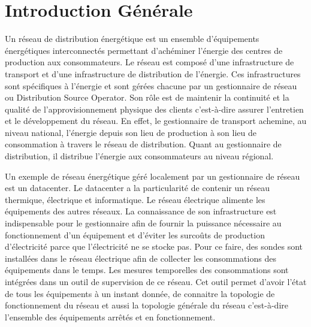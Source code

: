 \chapter{Introduction G\'en\'erale}

Un r\'eseau de distribution \'energ\'etique est un ensemble d'\'equipements \'energ\'etiques interconnect\'es permettant d'ach\'eminer l'\'energie des centres de production aux consommateurs. 
Le r\'eseau est compos\'e d'une infrastructure de transport et d'une infrastructure de distribution de l'\'energie. Ces infrastructures sont sp\'ecifiques \`a l'\'energie et sont g\'er\'ees chacune par un gestionnaire de r\'eseau ou Distribution Source Operator. Son r\^ole est de maintenir la continuit\'e et la qualit\'e de l'approvisionnement physique des clients c'est-\`a-dire assurer l'entretien et le d\'eveloppement du r\'eseau. 
En effet, le gestionnaire de transport achemine, au niveau national, l'\'energie depuis son lieu de production \`a son lieu de consommation \`a travers le r\'eseau de distribution. Quant au gestionnaire de distribution, il distribue l'\'energie aux consommateurs au niveau r\'egional.
\newline

Un exemple de r\'eseau \'energ\'etique g\'er\'e localement par un gestionnaire de r\'eseau est un datacenter. Le datacenter a la particularit\'e de contenir un r\'eseau thermique, \'electrique et informatique. Le r\'eseau \'electrique alimente les \'equipements des autres r\'eseaux. La connaissance de son infrastructure est indispensable pour le gestionnaire afin
de fournir  la puissance n\'ecessaire au fonctionnement d'un \'equipement et 
 d'\'eviter les surco\^uts de production d'\'electricit\'e parce que l'\'electricit\'e ne se stocke pas.
Pour ce faire, 
des sondes sont install\'ees dans le r\'eseau \'electrique afin de collecter les consommations des \'equipements dans le temps. Les mesures temporelles des consommations sont int\'egr\'ees dans un outil de supervision de ce r\'eseau. Cet outil permet d'avoir l'\'etat de tous les \'equipements \`a un instant donn\'ee, de connaitre la topologie de fonctionnement du r\'eseau et aussi la topologie g\'en\'erale du r\'eseau c'est-\`a-dire l'ensemble des \'equipements arr\^et\'es et en fonctionnement.
\newline


